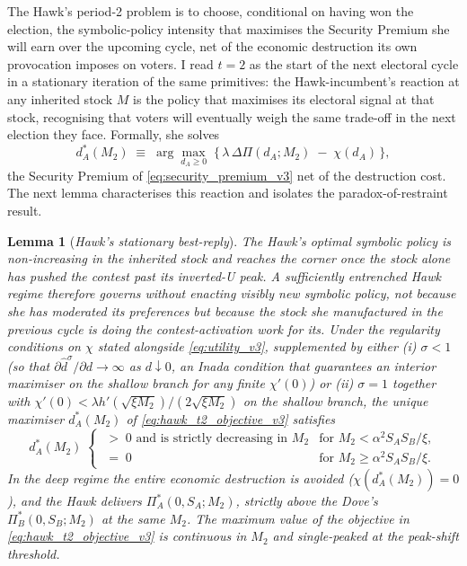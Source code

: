 \documentclass[11pt,twoside]{extarticle}
\newtheorem{lemma}{Lemma}
\begin{document}
The Hawk's period-2 problem is to choose, conditional on having won the election, the symbolic-policy intensity that maximises the Security Premium she will earn over the upcoming cycle, net of the economic destruction its own provocation imposes on voters. I read $t=2$ as the start of the next electoral cycle in a stationary iteration of the same primitives: the Hawk-incumbent's reaction at any inherited stock $M$ is the policy that maximises its electoral signal at that stock, recognising that voters will eventually weigh the same trade-off in the next election they face. Formally, she solves
\begin{equation}\label{eq:hawk_t2_objective_v3}
    d_A^*(M_2)\;\equiv\;\arg\max_{d_A\ge 0}\;\big\{\,\lambda\,\Delta\Pi(d_A;M_2)\;-\;\chi(d_A)\,\big\},
\end{equation}
the Security Premium of \autoref{eq:security_premium_v3} net of the destruction cost. The next lemma characterises this reaction and isolates the paradox-of-restraint result.

\begin{lemma}[\emph{Hawk's stationary best-reply}]\label{lem:hawk_t2_v3}
\emph{The Hawk's optimal symbolic policy is non-increasing in the inherited stock and reaches the corner once the stock alone has pushed the contest past its inverted-U peak. A sufficiently entrenched Hawk regime therefore governs without enacting visibly new symbolic policy, not because she has moderated its preferences but because the stock she manufactured in the previous cycle is doing the contest-activation work for its.}
Under the regularity conditions on $\chi$ stated alongside \autoref{eq:utility_v3}, supplemented by either (i) $\sigma<1$ (so that $\partial\hat d^\sigma/\partial d\to\infty$ as $d\downarrow 0$, an Inada condition that guarantees an interior maximiser on the shallow branch for any finite $\chi'(0)$) or (ii) $\sigma=1$ together with $\chi'(0)<\lambda h'(\sqrt{\xi M_2})/(2\sqrt{\xi M_2})$ on the shallow branch, the unique maximiser $d_A^*(M_2)$ of \autoref{eq:hawk_t2_objective_v3} satisfies
\begin{equation}\label{eq:dA_t2_v3}
    d_A^*(M_2)\;\begin{cases}
    \;>\;0 \text{ and is strictly decreasing in }M_2 & \text{for }M_2<\alpha^2 S_A S_B/\xi,\\[2pt]
    \;=\;0 & \text{for }M_2\ge\alpha^2 S_A S_B/\xi.
    \end{cases}
\end{equation}
In the deep regime the entire economic destruction is avoided ($\chi(d_A^*(M_2))=0$), and the Hawk delivers $\Pi_A^*(0,S_A;M_2)$, strictly above the Dove's $\Pi_B^*(0,S_B;M_2)$ at the same $M_2$. The maximum value of the objective in \autoref{eq:hawk_t2_objective_v3} is continuous in $M_2$ and single-peaked at the peak-shift threshold.
\end{lemma}
\end{document}
